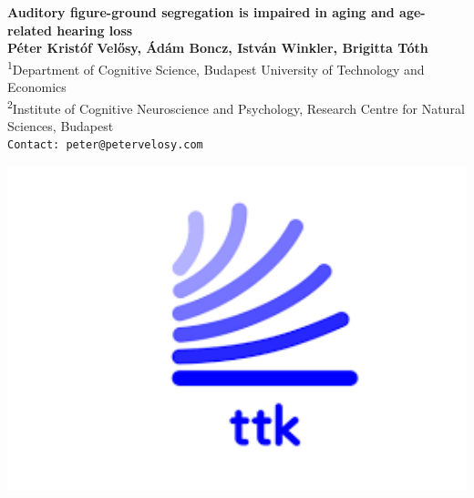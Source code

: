 \documentclass[a0,portrait]{a0poster}
\begin{document}


\begin{minipage}[b]{0.75\linewidth}
\veryHuge \color{NavyBlue} \textbf{Auditory figure-ground segregation is impaired in aging and age-related hearing loss} \color{Black}\\ %
\huge \textbf{Péter Kristóf Velősy\footnotemark[1], Ádám Boncz\footnotemark[2], István Winkler\footnotemark[2], Brigitta Tóth\footnotemark[2]}\\[0.5cm] %
\Large \textsuperscript{1}Department of Cognitive Science, Budapest University of Technology and Economics\\[0.4cm] %
\Large \textsuperscript{2}Institute of Cognitive Neuroscience and Psychology,
Research Centre for Natural Sciences, Budapest\\[0.4cm] %
\Large \texttt{Contact: peter@petervelosy.com}\\
\end{minipage}
%
\begin{minipage}[b]{0.25\linewidth}
\includegraphics[width=20cm]{ttk_logo.png}\\
\end{minipage}
\end{document}
